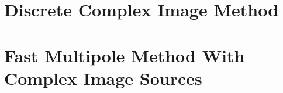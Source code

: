 \section{Discrete Complex Image Method}

\section{Fast Multipole Method With Complex Image Sources}
